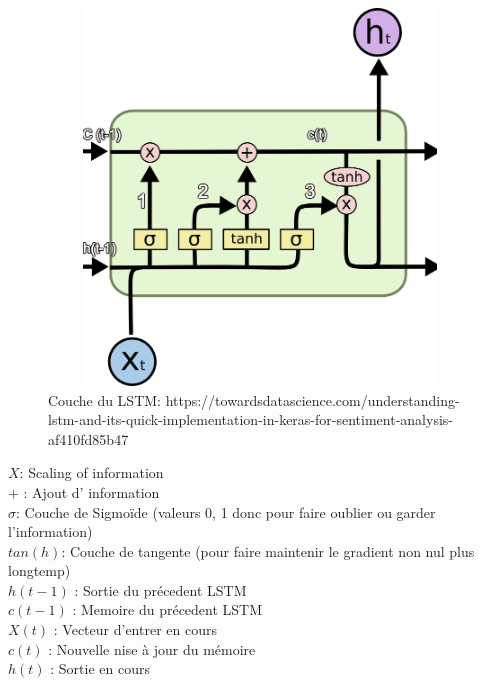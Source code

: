 \begin{itemize}
\begin{itemize}
	\end{itemize}
	  		\begin{figure}[h]
\begin{center}
\includegraphics[width=12cm,height=10cm]{images/lstm_layer.png}
\caption[Couche du LSTM: https://towardsdatascience.com/understanding-lstm-and-its-quick-implementation-in-keras-for-sentiment-analysis-af410fd85b47]{Couche du LSTM: https://towardsdatascience.com/understanding-lstm-and-its-quick-implementation-in-keras-for-sentiment-analysis-af410fd85b47}
\label{monlabel}
\end{center}
\end{figure}


\end{itemize}
$X$: Scaling of information\\
$+$ : Ajout d' information\\
$\sigma$: Couche de Sigmoïde (valeurs {0, 1} donc pour faire oublier ou garder l’information)\\
$tan(h)$: Couche de tangente (pour faire maintenir le gradient non nul plus longtemp)\\
$h(t-1)$ : Sortie du précedent LSTM\\
$c(t-1)$ : Memoire du précedent LSTM\\
$X(t)$ : Vecteur d'entrer en cours\\
$c(t)$ : Nouvelle nise à jour du mémoire\\
$h(t)$ : Sortie en cours\\